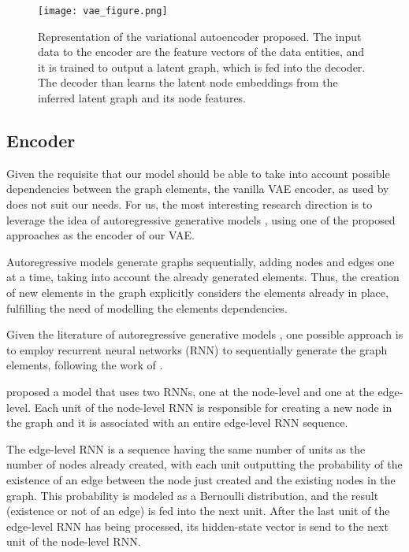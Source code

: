 \documentclass[12pt,a4paper]{article}
\begin{document}
	\begin{figure}[hbtp]
		\texttt{[image: vae\_figure.png]}
		\caption{Representation of the variational autoencoder proposed. The input data to the encoder are the feature vectors of the data entities, and it is trained to output a latent graph, which is fed into the decoder. The decoder than learns the latent node embeddings from the inferred latent graph and its node features.\label{vae}}
	\end{figure}
	
	
	\subsection{Encoder}
	
	Given the requisite that our model should be able to take into account possible dependencies between the graph elements, the vanilla VAE encoder, as used by \textcite{KipfNRI2018} does not suit our needs. For us, the most interesting research direction is to leverage the idea of autoregressive generative models \citep{Li2018, You2018, Liao2019}, using one of the proposed approaches as the encoder of our VAE.
	
	Autoregressive models generate graphs sequentially, adding nodes and edges one at a time, taking into account the already generated elements. Thus, the creation of new elements in the graph explicitly considers the elements already in place, fulfilling the need of modelling the elements dependencies.
	
	Given the literature of autoregressive generative models \citep{Li2018, You2018, Liao2019}, one possible approach is to employ recurrent neural networks (RNN) to sequentially generate the graph elements, following the work of \textcite{You2018}.
	
	\textcite{You2018} proposed a model that uses two RNNs, one at the node-level and one at the edge-level. Each unit of the node-level RNN is responsible for creating a new node in the graph and it is associated with an entire edge-level RNN sequence.
	
	The edge-level RNN is a sequence having the same number of units as the number of nodes already created, with each unit outputting the probability of the existence of an edge between the node just created and the existing nodes in the graph. This probability is modeled as a Bernoulli distribution, and the result (existence or not of an edge) is fed into the next unit. After the last unit of the edge-level RNN has being processed, its hidden-state vector is send to the next unit of the node-level RNN.
	
\end{document}
